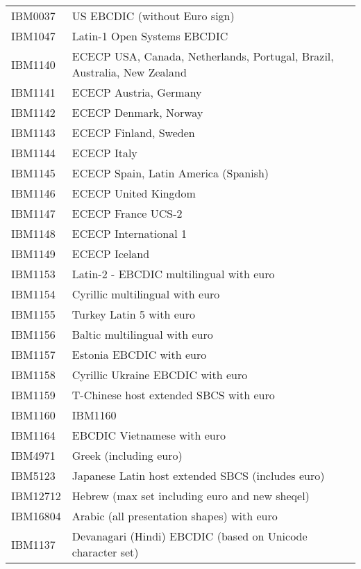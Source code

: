 \documentclass[letterpaper,10pt,english]{sphinxmanual}
\begin{document}
\begin{savenotes}\sphinxattablestart
\centering
\begin{tabulary}{\linewidth}[t]{|T|T|}
\hline
{}\relax &\relax \\
\hline
IBM0037
&
US EBCDIC (without Euro sign)
\\
\hline
IBM1047
&
Latin-1 Open Systems EBCDIC
\\
\hline
IBM1140
&
ECECP USA, Canada, Netherlands, Portugal, Brazil, Australia, New Zealand
\\
\hline
IBM1141
&
ECECP Austria, Germany
\\
\hline
IBM1142
&
ECECP Denmark, Norway
\\
\hline
IBM1143
&
ECECP Finland, Sweden
\\
\hline
IBM1144
&
ECECP Italy
\\
\hline
IBM1145
&
ECECP Spain, Latin America (Spanish)
\\
\hline
IBM1146
&
ECECP United Kingdom
\\
\hline
IBM1147
&
ECECP France UCS-2
\\
\hline
IBM1148
&
ECECP International 1
\\
\hline
IBM1149
&
ECECP Iceland
\\
\hline
IBM1153
&
Latin-2 - EBCDIC multilingual with euro
\\
\hline
IBM1154
&
Cyrillic multilingual with euro
\\
\hline
IBM1155
&
Turkey Latin 5 with euro
\\
\hline
IBM1156
&
Baltic multilingual with euro
\\
\hline
IBM1157
&
Estonia EBCDIC with euro
\\
\hline
IBM1158
&
Cyrillic Ukraine EBCDIC with euro
\\
\hline
IBM1159
&
T-Chinese host extended SBCS with euro
\\
\hline
IBM1160
&
IBM1160
\\
\hline
IBM1164
&
EBCDIC Vietnamese with euro
\\
\hline
IBM4971
&
Greek (including euro)
\\
\hline
IBM5123
&
Japanese Latin host extended SBCS (includes euro)
\\
\hline
IBM12712
&
Hebrew (max set including euro and new sheqel)
\\
\hline
IBM16804
&
Arabic (all presentation shapes) with euro
\\
\hline
IBM1137
&
Devanagari (Hindi) EBCDIC (based on Unicode character set)
\\
\hline
\end{tabulary}
\par
\sphinxattableend\end{savenotes}
\end{document}
